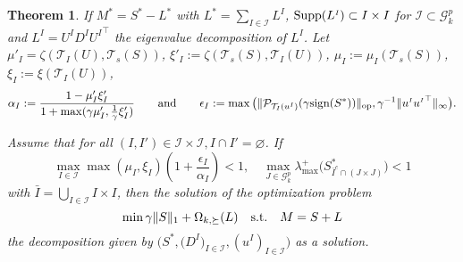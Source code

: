 \documentclass{article}
\def\T{\mathcal{T}}
\def\I{\mathcal{I}}
\def\op{{\rm op}}
\def\supp{{\rm Supp}}
\def\st{\text{s.t.}}
\newcommand\sss[1]{{\scriptscriptstyle#1}}
\def\uI{u^{\sss{I}}}
\def\xxi{\zeta}
\newtheorem{theorem}{Theorem}
\begin{document}
\begin{theorem}
\label{theo:two}
If $M^*=S^*-L^*$ with $L^*=\sum_{I \in \mathcal{I}} L^{\sss{I}}$, $\supp(L^{\sss{I}}) \subset I \times I$ for $\I \subset \mathcal{G}^p_k$ %
and $L^{\sss{I}}=U^{\sss{I}} D^{\sss{I}} {U^{\sss{I}}}^\top$ the eigenvalue decomposition of $L^{\sss{I}}$.
Let $\mu'_I=\xxi(\T_I(U),\T_s(S))$, $\xi'_I :=\xxi(\T_s(S),\T_I(U))$, $\mu_I:=\mu_I(\T_s(S))$, $\xi_I:=\xi(\T_I(U))$, 
$$\alpha_I:=\frac{1-\mu'_I\xi'_I}{1+\max(\gamma \mu'_I,\frac{1}{\gamma} \xi'_I)} \qquad \text{and} \qquad \epsilon_I :=\max \big (\|\mathcal{P}_{\T_I(\uI)}(\gamma \text{sign}(S^*))\|_{\op}, \gamma^{-1}\|\uI {\uI}^\top\|_{\infty} \big ).$$

Assume that for all $(I,I') \in \I \times \I, I \cap I'=\varnothing$. If $$\displaystyle\max_{I \in \I} \max(\mu_I,\xi_I) (1+\frac{\epsilon_I}{\alpha_I})<1, \quad \displaystyle \max_{J \in \mathcal{G}^p_k} \lambda_{\max}^+\big (S^*_{\bar{I}^c \cap (J \times J)} \big ) <1$$ %
with $\displaystyle \bar{I}=\bigcup_{I \in \I} I \times I$,
then the solution of the optimization problem $$\displaystyle \min \gamma \|S\|_1+\Omega_{k,\succeq}(L) \quad \text{\st} \quad M=S+L$$
 the decomposition given by $\big (S^*,(D^{\sss{I}} \big)_{I \in \I},(\uI)_{I \in \I} \big )$ as a solution.
\end{theorem}
\end{document}
